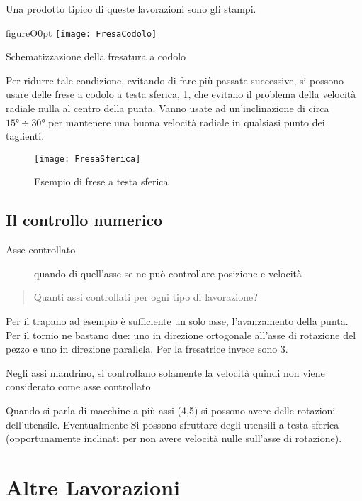 Una prodotto tipico di queste lavorazioni sono gli stampi.

\begin{wrapfloat}{figure}{O}{0pt}
\texttt{[image: FresaCodolo]}
\caption{Schematizzazione della fresatura a codolo}
\label{fig:FresaCodolo}
\end{wrapfloat}

Per ridurre tale condizione, evitando di fare più passate successive, si possono usare delle frese a codolo a testa sferica, \ref{fig:FresaSferica}, che evitano il problema della velocità radiale nulla al centro della punta. Vanno usate ad un'inclinazione di circa $15\unit{\degree} \div 30\unit{\degree}$ per mantenere una buona velocità radiale in qualsiasi punto dei taglienti. 

\begin{figure}
\centering
\texttt{[image: FresaSferica]}
\caption{Esempio di frese a testa sferica}
\label{fig:FresaSferica}
\end{figure}

\section*{Il controllo numerico}
\begin{description}
\item[Asse controllato] quando di quell'asse se ne può controllare posizione e velocità
\end{description}

\begin{quote}
Quanti assi controllati per ogni tipo di lavorazione?
\end{quote}

Per il trapano ad esempio è sufficiente un solo asse, l'avanzamento della punta.
Per il tornio ne bastano due: uno in direzione ortogonale all'asse di rotazione del pezzo e uno in direzione 
parallela.
Per la fresatrice invece sono 3.

Negli assi mandrino, si controllano solamente la velocità quindi non viene considerato come asse controllato.

Quando si parla di macchine a più assi (4,5) si possono avere delle rotazioni dell'utensile.
Eventualmente Si possono sfruttare degli utensili a testa sferica (opportunamente inclinati per non avere 
velocità nulle sull'asse di rotazione).

\chapter{Altre Lavorazioni}\label{chp:AltreLav}
